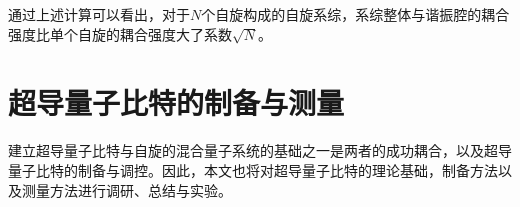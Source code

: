             
           通过上述计算可以看出，对于$N$个自旋构成的自旋系综，系综整体与谐振腔的耦合强度比单个自旋的耦合强度大了系数$\sqrt N$。
            




        \section{超导量子比特的制备与测量} %
        \label{sec:fabrication_characterization}
            
            建立超导量子比特与自旋的混合量子系统的基础之一是两者的成功耦合，以及超导量子比特的制备与调控。因此，本文也将对超导量子比特的理论基础\cite{schuster2007circuit,koch2007charge}，制备方法\cite{krantz2010investigation,kelly2015fault}以及测量方法\cite{weber2016quantum}进行调研、总结与实验。



